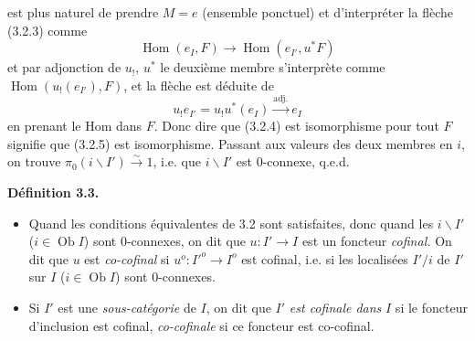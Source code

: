 \documentclass[11pt]{article}
\newcommand{\printedpage}[1]{\marginpar{\footnotesize p.~#1}}
\def\dcprintedpending{}
\newcommand{\msp}[1]{\marginpar{\footnotesize\raggedright
  \ifx\dcprintedpending\empty\else p.~\dcprintedpending\par\fi
  [#1]}\gdef\dcprintedpending{}}
\newcommand{\Hom}{\operatorname{Hom}}
\newcommand{\Ob}{\operatorname{Ob}}
\newcommand{\bs}{\backslash}
\begin{document}
\printedpage{29}

\msp{page 45}
est plus naturel de prendre $M = e$ (ensemble ponctuel) et d'interpréter la flèche (3.2.3) comme
\[
\Hom(e_I, F) \longrightarrow \Hom(e_{I'}, u^*F)
\tag*{(3.2.4)}
\]
et par adjonction de $u_!$, $u^*$ le deuxième membre s'interprète comme $\Hom(u_!(e_{I'}), F)$, et la flèche est déduite de
\[
u_!e_{I'} = u_!u^*(e_I) \xrightarrow{\text{adj.}} e_I
\tag*{(3.2.5)}
\]
en prenant le Hom dans $F$. Donc dire que (3.2.4) est isomorphisme pour tout $F$ signifie que (3.2.5) est isomorphisme. Passant aux valeurs des deux membres en $i$, on trouve $\pi_0(i\bs I') \xrightarrow{\sim} 1$, i.e. que $i\bs I'$ est 0-connexe, q.e.d.

\noindent\textbf{Définition 3.3.}
\begin{itemize}[label={}]
\item[a)] Quand les conditions équivalentes de 3.2 sont satisfaites, donc quand les $i\bs I'$ ($i \in \Ob I$) sont 0-connexes, on dit que $u : I' \longrightarrow I$ est un foncteur \textit{cofinal.} On dit que $u$ est \textit{co-cofinal} si $u^o : I'^o \longrightarrow I^o$ est cofinal, i.e. si les localisées $I'/i$ de $I'$ sur $I$ ($i \in \Ob I$) sont 0-connexes.
\item[b)] Si $I'$ est une \textit{sous-catégorie} de $I$, on dit que $I'$ \textit{est cofinale dans} $I$ si le foncteur d'inclusion est cofinal, \textit{co-cofinale} si ce foncteur est co-cofinal.
\end{itemize}
\end{document}
